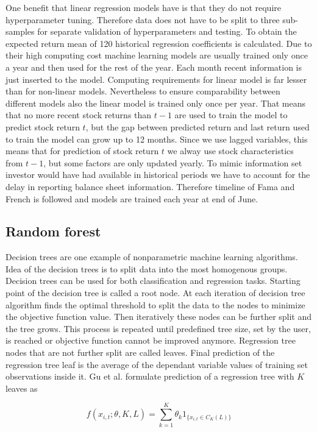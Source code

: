 \documentclass{article}
\begin{document}
One benefit that linear regression models have is that they do not require hyperparameter tuning. Therefore data  does not have to be split to three sub-samples for separate validation of hyperparameters and testing. To obtain the expected return mean of 120 historical regression coefficients is calculated. Due to their high computing cost machine learning models are usually trained only once a year and then used for the rest of the year. Each month recent information is just inserted to the model. Computing requirements for linear model is far lesser than for non-linear models. Nevertheless to ensure comparability between different models also the linear model is trained only once per year. That means that no more recent stock returns than $t-1$ are used to train the model to predict stock return $t$, but the gap between predicted return and last return used to train the model can grow up to 12 months. Since we use lagged variables, this means that for prediction of stock return $t$ we alway use stock characteristics from $t-1$, but some factors are only updated yearly. To mimic information set investor would have had available in historical periods we have to account for the delay in reporting balance sheet information. Therefore timeline of Fama and French \citeyear{FAMA19933} is followed and models are trained each year at end of June. 

\subsection{Random forest}

Decision trees are one example of nonparametric machine learning algorithms. Idea of the decision trees is to split data into the most homogenous groups. Decision trees can be used for both classification and regression tasks. Starting point of the decision tree is called a root node. At each iteration of decision tree algorithm finds the optimal threshold to split the data to the nodes to minimize the objective function value. Then iteratively these nodes can be further split and the tree grows. This process is repeated until predefined tree size, set by the user, is reached or objective function cannot be improved anymore. Regression tree nodes that are not further split are called leaves. Final prediction of the regression tree leaf is the average of the dependant variable values of training set observations inside it. Gu et al. \citeyear{guetal} formulate prediction of a regression tree with $K$ leaves as 

\begin{equation}
f(x_{i, t}; \theta, K, L) = \sum_{k=1}^K \theta_k 1 _{\{x_{i, t} \in C_K(L)\}}
\end{equation}
\end{document}
